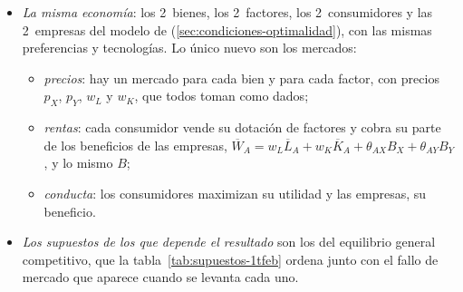 \documentclass[11pt]{article}
\begin{document}
\begin{itemize}
\item \emph{La misma economía}: los 2~bienes, los 2~factores, los 2~consumidores y las 2~empresas del modelo de  (\ref{sec:condiciones-optimalidad}), con las mismas preferencias y tecnologías. Lo único nuevo son los mercados:
  \begin{itemize}
  \item \emph{precios}: hay un mercado para cada bien y para cada factor, con precios $p_X$, $p_Y$, $w_L$ y $w_K$, que todos toman como dados;
  \item \emph{rentas}: cada consumidor vende su dotación de factores y cobra su parte de los beneficios de las empresas, $\overline{W}_A=w_L\overline{L}_A+w_K\overline{K}_A+\theta_{AX}B_X+\theta_{AY}B_Y$, y lo mismo $B$;
  \item \emph{conducta}: los consumidores maximizan su utilidad y las empresas, su beneficio.
  \end{itemize}
\item \emph{Los supuestos de los que depende el resultado} son los del equilibrio general competitivo, que la tabla~\ref{tab:supuestos-1tfeb} ordena junto con el fallo de mercado que aparece cuando se levanta cada uno.
\end{itemize}
\end{document}
